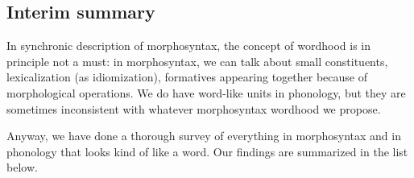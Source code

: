 \documentclass[a4paper, oneside, scheme=plain, 12pt]{article}
\begin{document}
\subsection{Interim summary}\label{sec:all-wordhood}

In synchronic description of morphosyntax,
the concept of wordhood is in principle not a must:
in morphosyntax, we can talk about small constituents, lexicalization (as idiomization),
formatives appearing together because of morphological operations.
We do have word-like units in phonology,
but they are sometimes inconsistent with whatever morphosyntax wordhood we propose.

Anyway, we have done a thorough survey of everything in morphosyntax and in phonology that looks kind of like a word. 
Our findings are summarized in the list below.
\end{document}
